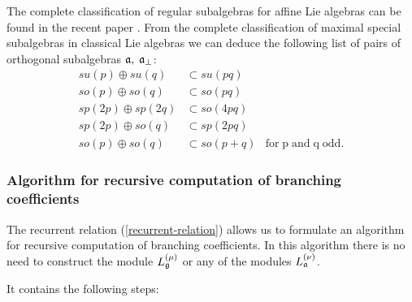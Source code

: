 The complete classification of regular subalgebras for affine Lie algebras
can be found in the recent paper \cite{1751-8121-41-36-365204}. From the complete
classification of maximal special subalgebras in classical Lie algebras \cite
{dynkin1952semisimple} we can deduce the following list of pairs of
orthogonal subalgebras $\mathfrak{a},\;\mathfrak{a}_{\bot }$:
\begin{equation*}
\begin{array}{lll}
su(p)\oplus su(q) & \subset su(pq) &  \\
so(p)\oplus so(q) & \subset so(pq) &  \\
sp(2p)\oplus sp(2q) & \subset so(4pq) &  \\
sp(2p)\oplus so(q) & \subset sp(2pq) &  \\
so(p)\oplus so(q) & \subset so(p+q) & \mathrm{{for}\;p\;{and}\;q\;{odd}.}
\end{array}
\end{equation*}


\subsubsection{Algorithm for recursive computation of branching coefficients}

\label{sec:algorithm}

The recurrent relation (\ref{recurrent-relation}) allows us to formulate an
algorithm for recursive computation of branching coefficients. In this
algorithm there is no need to construct the module $L^{(\mu)}_{\frak{g}}$ or
any of the modules $L^{(\nu)}_{\mathfrak{a}}$.

It contains the following steps:

